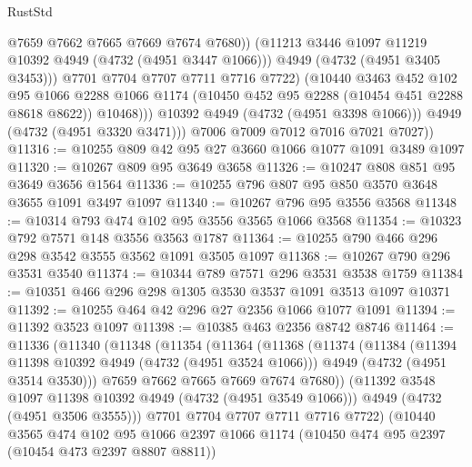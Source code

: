 \begin{lexlean}{RustStd}
\begin{coremodule}
{\begin{coremodule}
{{{{{{{{{{{{{{                        @7659
                        @7662
                        @7665
                        @7669
                        @7674
                        @7680))
                    (@11213 @3446 @1097 @11219 @10392 @4949 (@4732 (@4951 @3447 @1066)))
                    @4949
                    (@4732 (@4951 @3405 @3453)))
                  @7701
                  @7704
                  @7707
                  @7711
                  @7716
                  @7722)
                (@10440
                  @3463
                  @452
                  @102
                  @95
                  @1066
                  @2288
                  @1066
                  @1174
                  (@10450 @452 @95 @2288 (@10454 @451 @2288 @8618 @8622))
                  @10468)))
            @10392
            @4949
            (@4732 (@4951 @3398 @1066)))
          @4949
          (@4732 (@4951 @3320 @3471)))
        @7006
        @7009
        @7012
        @7016
        @7021
        @7027))
@11316 := @10255 @809 @42 @95 @27 @3660 @1066 @1077 @1091 @3489 @1097
@11320 := @10267 @809 @95 @3649 @3658
@11326 := @10247 @808 @851 @95 @3649 @3656 @1564
@11336 := @10255 @796 @807 @95 @850 @3570 @3648 @3655 @1091 @3497 @1097
@11340 := @10267 @796 @95 @3556 @3568
@11348 := @10314 @793 @474 @102 @95 @3556 @3565 @1066 @3568
@11354 := @10323 @792 @7571 @148 @3556 @3563 @1787
@11364 := @10255 @790 @466 @296 @298 @3542 @3555 @3562 @1091 @3505 @1097
@11368 := @10267 @790 @296 @3531 @3540
@11374 := @10344 @789 @7571 @296 @3531 @3538 @1759
@11384 := @10351 @466 @296 @298 @1305 @3530 @3537 @1091 @3513 @1097 @10371
@11392 := @10255 @464 @42 @296 @27 @2356 @1066 @1077 @1091
@11394 := @11392 @3523 @1097
@11398 := @10385 @463 @2356 @8742 @8746
@11464 := @11336
    (@11340
      (@11348
        (@11354
          (@11364
            (@11368
              (@11374
                (@11384
                  (@11394 @11398 @10392 @4949 (@4732 (@4951 @3524 @1066)))
                  @4949
                  (@4732 (@4951 @3514 @3530)))
                @7659
                @7662
                @7665
                @7669
                @7674
                @7680))
            (@11392 @3548 @1097 @11398 @10392 @4949 (@4732 (@4951 @3549 @1066)))
            @4949
            (@4732 (@4951 @3506 @3555)))
          @7701
          @7704
          @7707
          @7711
          @7716
          @7722)
        (@10440
          @3565
          @474
          @102
          @95
          @1066
          @2397
          @1066
          @1174
          (@10450 @474 @95 @2397 (@10454 @473 @2397 @8807 @8811))
}}}}}}}}}}}}}}
\end{coremodule}}
\end{coremodule}
\end{lexlean}
